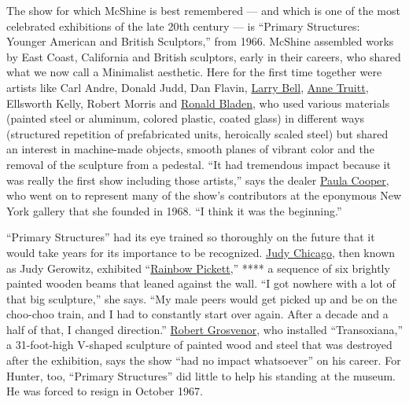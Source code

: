 The show for which McShine is best remembered --- and which is one of
the most celebrated exhibitions of the late 20th century --- is
``Primary Structures: Younger American and British Sculptors,'' from
1966. McShine assembled works by East Coast, California and British
sculptors, early in their careers, who shared what we now call a
Minimalist aesthetic. Here for the first time together were artists like
Carl Andre, Donald Judd, Dan Flavin,
\href{https://www.nytimes3xbfgragh.onion/2018/06/15/t-magazine/mary-heilmann-larry-bell-conversation.html}{Larry
Bell},
\href{https://www.nytimes3xbfgragh.onion/2018/11/21/t-magazine/female-land-artists.html}{Anne
Truitt}, Ellsworth Kelly, Robert Morris and
\href{https://www.nytimes3xbfgragh.onion/1988/02/04/obituaries/ronald-bladen-69-sculptor-famed-for-stark-poetic-images.html}{Ronald
Bladen}, who used various materials (painted steel or aluminum, colored
plastic, coated glass) in different ways (structured repetition of
prefabricated units, heroically scaled steel) but shared an interest in
machine-made objects, smooth planes of vibrant color and the removal of
the sculpture from a pedestal. ``It had tremendous impact because it was
really the first show including those artists,'' says the dealer
\href{https://www.nytimes3xbfgragh.onion/slideshow/2016/10/11/t-magazine/my-life-in-pictures-paula-cooper/s/paula-cooper-slide-010G.html}{Paula
Cooper}, who went on to represent many of the show's contributors at the
eponymous New York gallery that she founded in 1968. ``I think it was
the beginning.''

``Primary Structures'' had its eye trained so thoroughly on the future
that it would take years for its importance to be recognized.
\href{https://www.nytimes3xbfgragh.onion/2018/02/07/t-magazine/judy-chicago-dinner-party.html}{Judy
Chicago}, then known as Judy Gerowitz, exhibited
``\href{https://www.artsy.net/artwork/judy-chicago-rainbow-pickett}{Rainbow
Pickett},'' **** a sequence of six brightly painted wooden beams that
leaned against the wall. ``I got nowhere with a lot of that big
sculpture,'' she says. ``My male peers would get picked up and be on the
choo-choo train, and I had to constantly start over again. After a
decade and a half of that, I changed direction.''
\href{https://www.paulacoopergallery.com/artists/robert-grosvenor/selected-works}{Robert
Grosvenor}, who installed ``Transoxiana,'' a 31-foot-high V-shaped
sculpture of painted wood and steel that was destroyed after the
exhibition, says the show ``had no impact whatsoever'' on his career.
For Hunter, too, ``Primary Structures'' did little to help his standing
at the museum. He was forced to resign in October 1967.

